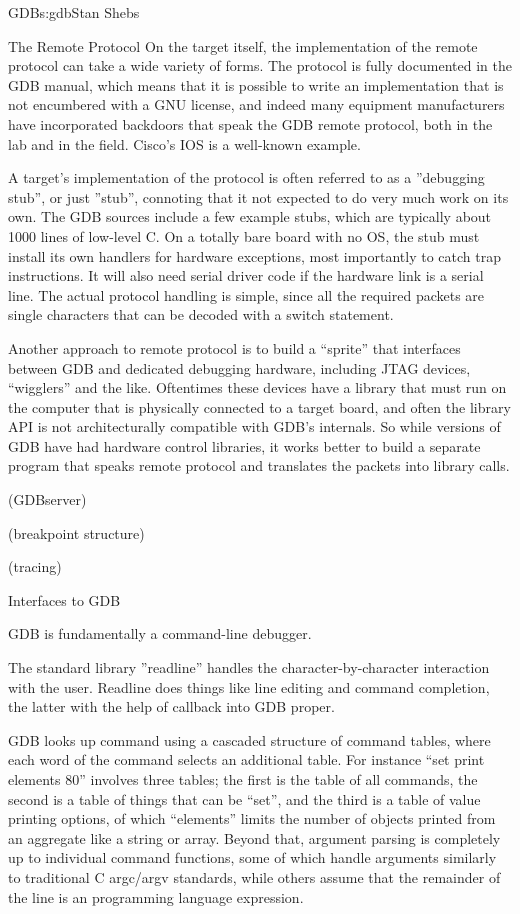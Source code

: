 \begin{aosachapter}{GDB}{s:gdb}{Stan Shebs}
\begin{aosasect1}{The Remote Protocol}
On the target itself, the implementation of the remote protocol can
take a wide variety of forms.  The protocol is fully documented in the
GDB manual, which means that it is possible to write an implementation
that is not encumbered with a GNU license, and indeed many equipment
manufacturers have incorporated backdoors that speak the GDB remote
protocol, both in the lab and in the field.  Cisco's IOS is a well-known
example.

A target's implementation of the protocol is often referred to as a
''debugging stub'', or just ''stub'', connoting that it not expected
to do very much work on its own.  The GDB sources include a few
example stubs, which are typically about 1000 lines of low-level C.
On a totally bare board with no OS, the stub must install its own
handlers for hardware exceptions, most importantly to catch trap
instructions.  It will also need serial driver code if the hardware
link is a serial line.  The actual protocol handling is simple, since
all the required packets are single characters that can be decoded
with a switch statement.

Another approach to remote protocol is to build a ``sprite'' that
interfaces between GDB and dedicated debugging hardware, including
JTAG devices, ``wigglers'' and the like.  Oftentimes these devices
have a library that must run on the computer that is physically
connected to a target board, and often the library API is not
architecturally compatible with GDB's internals.  So while versions
of GDB have had hardware control libraries, it works better to build
a separate program that speaks remote protocol and translates the
packets into library calls.

\end{aosasect1}

(GDBserver)

(breakpoint structure)

(tracing)

\begin{aosasect1}{Interfaces to GDB}

GDB is fundamentally a command-line debugger.

The standard library ''readline'' handles the character-by-character interaction
with the user.  Readline does things like line editing and command completion, the
latter with the help of callback into GDB proper.

GDB looks up command using a cascaded structure of command tables,
where each word of the command selects an additional table.  For
instance ``set print elements 80'' involves three tables; the first is
the table of all commands, the second is a table of things that can be
``set'', and the third is a table of value printing options, of which
``elements'' limits the number of objects printed from an aggregate
like a string or array.  Beyond that, argument parsing is completely
up to individual command functions, some of which handle arguments
similarly to traditional C argc/argv standards, while others assume
that the remainder of the line is an programming language expression.


\end{aosasect1}
\end{aosachapter}
